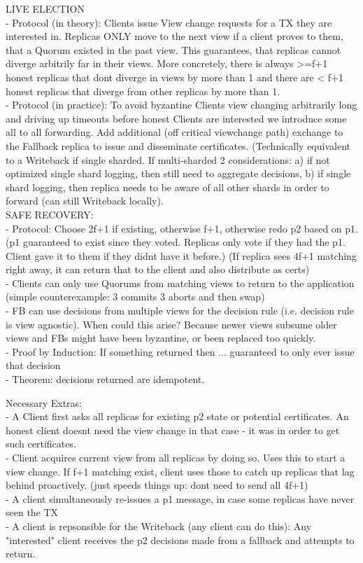 LIVE ELECTION\\
- Protocol (in theory): Clients issue View change requests for a TX they are interested in. Replicas ONLY move to the next view if a client proves to them, that a Quorum existed in the past view. This guarantees, that replicas cannot diverge arbitrily far in their views. More concretely, there is always >=f+1 honest replicas that dont diverge in views by more than 1 and there are < f+1 honest replicas that diverge from other replicas by more than 1.\\


- Protocol (in practice): To avoid byzantine Clients view changing arbitrarily long and driving up timeouts before honest Clients are interested we introduce some all to all forwarding.
Add additional (off critical viewchange path) exchange to the Fallback replica to issue and disseminate certificates. (Technically equivalent to a Writeback if single sharded. If multi-sharded 2 considerations: a) if not optimized single shard logging, then still need to aggregate decisions, b) if single shard logging, then replica needs to be aware of all other shards in order to forward (can still Writeback locally).\\

SAFE RECOVERY:\\
- Protocol: Choose 2f+1 if existing, otherwise f+1, otherwise redo p2 based on p1. (p1 guaranteed to exist since they voted. Replicas only vote if they had the p1. Client gave it to them if they didnt have it before.) (If replica sees 4f+1 matching right away, it can return that to the client and also distribute as certs)\\
- Clients can only use Quorums from matching views to return to the application (simple counterexample: 3 commits 3 aborts and then swap)\\
- FB can use decisions from multiple views for the decision rule (i.e. decision rule is view agnostic). When could this arise? Because newer views subsume older views and FBs might have been byzantine, or been replaced too quickly. \\
- Proof by Induction: If something returned then ... guaranteed to only ever issue that decision\\
- Theorem: decisions returned are idempotent.



Necessary Extras:\\
- A Client first asks all replicas for existing p2 state or potential certificates. An honest client doesnt need the view change in that case - it was in order to get such certificates.\\
- Client acquires current view from all replicas by doing so. Uses this to start a view change. If f+1 matching exist, client uses those to catch up replicas that lag behind proactively. (just speeds things up: dont need to send all 4f+1)\\
- A client simultaneously re-issues a p1 message, in case some replicas have never seen the TX\\
- A client is repsonsible for the Writeback (any client can do this): Any "interested" client receives the p2 decisions made from a fallback and attempts to return. \\


